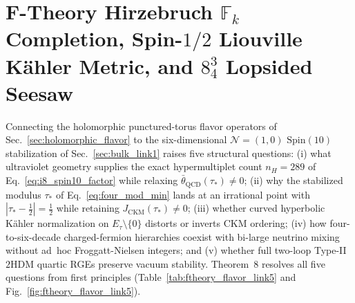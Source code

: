 \documentclass[aps,prd,twocolumn,nofootinbib,floatfix]{revtex4-2}
\begin{document}
\section{F-Theory Hirzebruch $\mathbb{F}_k$ Completion, Spin-$1/2$ Liouville K\"ahler Metric, and $8^3_4$ Lopsided Seesaw}
\label{sec:ftheory_flavor_link5}

Connecting the holomorphic punctured-torus flavor operators of Sec.~\ref{sec:holomorphic_flavor} to the six-dimensional $\mathcal{N}=(1,0)$ $\mathrm{Spin}(10)$ stabilization of Sec.~\ref{sec:bulk_link1} raises five structural questions: (i) what ultraviolet geometry supplies the exact hypermultiplet count $n_H = 289$ of Eq.~\eqref{eq:i8_spin10_factor} while relaxing $\bar{\theta}_{\mathrm{QCD}}(\tau_*) \ne 0$; (ii) why the stabilized modulus $\tau_*$ of Eq.~\eqref{eq:four_mod_min} lands at an irrational point with $|\tau_* - \frac{1}{2}| = \frac{1}{2}$ while retaining $J_{\mathrm{CKM}}(\tau_*) \ne 0$; (iii) whether curved hyperbolic K\"ahler normalization on $E_\tau\setminus\{0\}$ distorts or inverts CKM ordering; (iv) how four-to-six-decade charged-fermion hierarchies coexist with bi-large neutrino mixing without ad~hoc Froggatt-Nielsen integers; and (v) whether full two-loop Type-II $2\mathrm{HDM}$ quartic RGEs preserve vacuum stability. Theorem~8 resolves all five questions from first principles (Table~\ref{tab:ftheory_flavor_link5} and Fig.~\ref{fig:ftheory_flavor_link5}).
\end{document}
